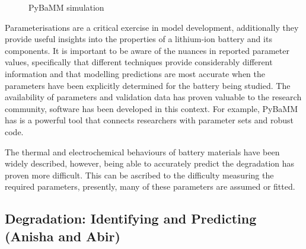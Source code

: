 \documentclass[journal=jacsat,manuscript=article]{achemso}
\begin{document}
\begin{figure}[h]
    \centering
    \caption{\label{fig:pybamm} PyBaMM simulation} 
\end{figure}

Parameterisations are a critical exercise in model development, additionally they provide useful insights into the properties of a lithium-ion battery and its components. It is important to be aware of the nuances in reported parameter values, specifically that different techniques provide considerably different information and that modelling predictions are most accurate when the parameters have been explicitly determined for the battery being studied. The availability of parameters and validation data has proven valuable to the research community, software has been developed in this context. For example, PyBaMM has is a powerful tool that connects researchers with parameter sets and robust code.  

The thermal and electrochemical behaviours of battery materials have been widely described, however, being able to accurately predict the degradation has proven more difficult. This can be ascribed to the difficulty measuring the required parameters, presently, many of these parameters are assumed or fitted. 


\subsection{Degradation: Identifying and Predicting (Anisha and Abir)}
\end{document}
